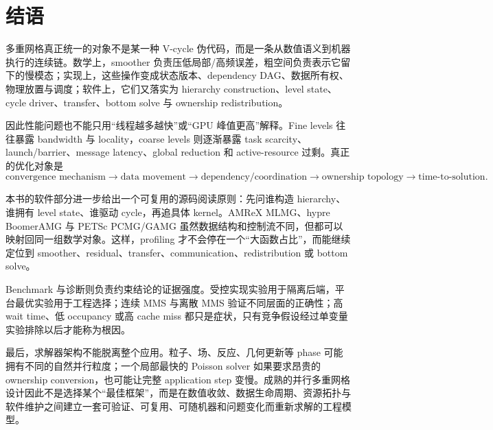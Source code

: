 \chapter*{结语}

多重网格真正统一的对象不是某一种 V-cycle 伪代码，而是一条从数值语义到机器执行的连续链。数学上，smoother 负责压低局部/高频误差，粗空间负责表示它留下的慢模态；实现上，这些操作变成状态版本、dependency DAG、数据所有权、物理放置与调度；软件上，它们又落实为 hierarchy construction、level state、cycle driver、transfer、bottom solve 与 ownership redistribution。

因此性能问题也不能只用“线程越多越快”或“GPU 峰值更高”解释。Fine levels 往往暴露 bandwidth 与 locality，coarse levels 则逐渐暴露 task scarcity、launch/barrier、message latency、global reduction 和 active-resource 过剩。真正的优化对象是
\begin{equation}
\boxed{
\text{convergence mechanism}
\rightarrow
\text{data movement}
\rightarrow
\text{dependency/coordination}
\rightarrow
\text{ownership topology}
\rightarrow
\text{time-to-solution}.
}
\end{equation}

本书的软件部分进一步给出一个可复用的源码阅读原则：先问谁构造 hierarchy、谁拥有 level state、谁驱动 cycle，再追具体 kernel。AMReX MLMG、hypre BoomerAMG 与 PETSc PCMG/GAMG 虽然数据结构和控制流不同，但都可以映射回同一组数学对象。这样，profiling 才不会停在一个“大函数占比”，而能继续定位到 smoother、residual、transfer、communication、redistribution 或 bottom solve。

Benchmark 与诊断则负责约束结论的证据强度。受控实现实验用于隔离后端，平台最优实验用于工程选择；连续 MMS 与离散 MMS 验证不同层面的正确性；高 wait time、低 occupancy 或高 cache miss 都只是症状，只有竞争假设经过单变量实验排除以后才能称为根因。

最后，求解器架构不能脱离整个应用。粒子、场、反应、几何更新等 phase 可能拥有不同的自然并行粒度；一个局部最快的 Poisson solver 如果要求昂贵的 ownership conversion，也可能让完整 application step 变慢。成熟的并行多重网格设计因此不是选择某个“最佳框架”，而是在数值收敛、数据生命周期、资源拓扑与软件维护之间建立一套可验证、可复用、可随机器和问题变化而重新求解的工程模型。
